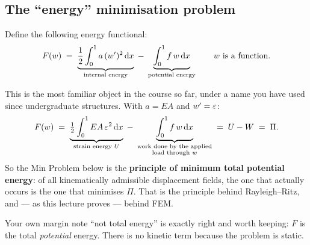 
\subsection*{The ``energy'' minimisation problem}

Define the following energy functional:
\begin{equation}\label{eq:Fdef}
  F(w) \;=\;
  \underbrace{\frac12\int_{0}^{1} a\,(w')^{2}\,\mathrm{d} x}_{\text{internal energy}}
  \;-\;
  \underbrace{\int_{0}^{1} f\,w\,\mathrm{d} x}_{\text{potential energy}}
  \qquad w \text{ is a function.}
\end{equation}

\begin{mechanics}
This is the most familiar object in the course so far, under a name you have
used since undergraduate structures. With $a=EA$ and $w'=\varepsilon$:
\[
  F(w) \;=\;
  \underbrace{\tfrac12\int_{0}^{1} EA\,\varepsilon^{2}\,\mathrm{d} x}_{\text{strain energy } U}
  \;-\;
  \underbrace{\int_{0}^{1} f\,w\,\mathrm{d} x}_{\substack{\text{work done by the applied}\\\text{load through } w}}
  \;=\; U - W \;=\; \Pi .
\]
So the Min Problem below is the \textbf{principle of minimum total potential
energy}: of all kinematically admissible displacement fields, the one that
actually occurs is the one that minimises $\Pi$. That is the principle behind
Rayleigh--Ritz, and --- as this lecture proves --- behind FEM.

Your own margin note ``not total energy'' is exactly right and worth keeping:
$F$ is the total \emph{potential} energy. There is no kinetic term because the
problem is static.
\end{mechanics}

